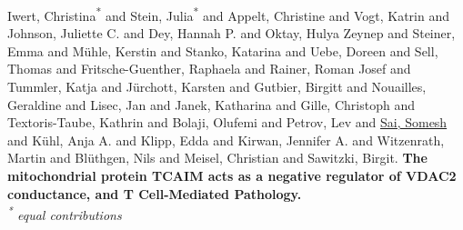Iwert, Christina\textsuperscript{*} and Stein, Julia\textsuperscript{*} and Appelt, Christine and Vogt, Katrin and Johnson, Juliette C. and Dey, Hannah P. and Oktay, Hulya Zeynep and Steiner, Emma and Mühle, Kerstin and Stanko, Katarina and Uebe, Doreen and  Sell, Thomas and Fritsche-Guenther, Raphaela and Rainer, Roman Josef and Tummler, Katja and Jürchott, Karsten and Gutbier, Birgitt and Nouailles, Geraldine  and Lisec, Jan and Janek, Katharina and Gille, Christoph and Textoris-Taube, Kathrin and Bolaji, Olufemi and Petrov, Lev and \underline{Sai, Somesh} and Kühl, Anja A. and Klipp, Edda and Kirwan, Jennifer A. and Witzenrath, Martin  and Blüthgen, Nils and Meisel, Christian and Sawitzki, Birgit. \textbf{The mitochondrial protein TCAIM acts as a negative regulator of VDAC2 conductance, and T Cell-Mediated Pathology.}\\\textit{\textsuperscript{*} equal contributions}\\





\hypersetup{
    colorlinks=true,
    linkcolor=black,
    filecolor=blue,      
    urlcolor=blue,
}

